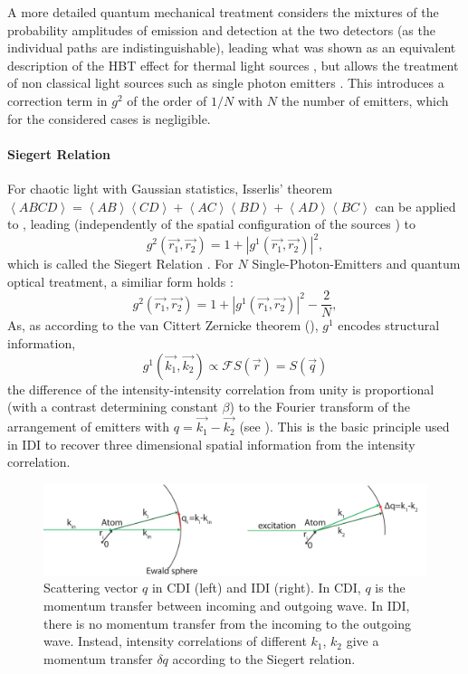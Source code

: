 A more detailed quantum mechanical treatment considers the mixtures of the probability amplitudes of emission and detection at the two detectors (as the individual paths are indistinguishable), leading what was shown as an equivalent description of the HBT effect for thermal light sources \cite{fano1961,sudarshan1963,glauber2006}, but allows the treatment of non classical light sources such as single photon emitters \cite{mandel1995,classen2017}. This introduces a correction term in $g^2$ of the order of $1/N$ with $N$ the number of emitters, which for the considered cases is negligible.



\paragraph{Siegert Relation}
For chaotic light with Gaussian statistics, Isserlis' theorem 
$\left<ABCD\right>=\left<AB\right>\left<CD\right>+\left<AC\right>\left<BD\right>+\left<AD\right>\left<BC\right>$ can be applied to , leading  (independently of the spatial configuration of the sources ) to
\begin{equation}
	g^2(\vec{r_1},\vec{r_2}) = 1+ |g^1(\vec{r_1},\vec{r_2}) |^2 ,
\end{equation}
which is called the Siegert Relation \cite{ou2017}.
For $N$ Single-Photon-Emitters and quantum optical treatment,  a similiar form holds \cite{classen2017}:
\begin{equation}
	g^2(\vec{r_1},\vec{r_2}) = 1+ |g^1(\vec{r_1},\vec{r_2}) |^2 - \frac{2}{N} ,
\end{equation}
As, as according to the van Cittert Zernicke theorem (), $g^1$ encodes structural information, 
\begin{equation}
	g^1(\vec{k_1},\vec{k_2}) \propto \mathscr{F}S(\vec{r}) = S(\vec{q})
\end{equation}
the difference of the intensity-intensity correlation from unity is proportional (with a contrast determining constant $\beta$) to the Fourier transform of the arrangement of emitters with $q=\vec{k_1}-\vec{k_2}$ (see ).
This is the basic principle used in IDI to recover three dimensional spatial information from the intensity correlation.
\begin{figure}
	\centering
	\includegraphics[width=0.9\linewidth]{images/scatteringvectors.pdf}
	\caption[Scattering Vectors]{Scattering vector $q$ in CDI (left) and IDI (right). In CDI, $q$ is the momentum transfer between incoming and outgoing wave. In IDI, there is no momentum transfer from the incoming to the outgoing wave. Instead, intensity correlations of different $k_1$, $k_2$ give a momentum transfer $\delta q$ according to the Siegert relation.}
	\label{fig:scatteringvectors}
	
\end{figure}

